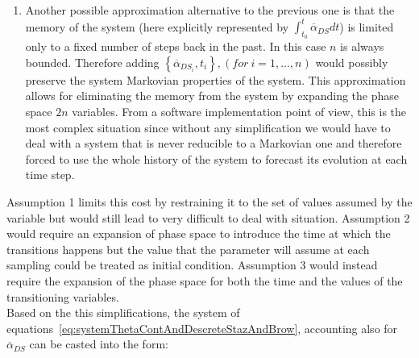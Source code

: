 \begin{enumerate}
  \item Another possible approximation alternative to the previous one is that the memory of the system (here 
  explicitly represented by $ \int_{t_{0}}^{t}  \overline{\alpha }_{DS} dt$) is limited 
  only to a fixed number of steps back in the past. In this case $n$ is always bounded. Therefore adding  $\left \{  
  \overline{\alpha}_{DS_{i}},t_{i} \right \}, \left ( for\: i=1,...,n \right )$ would possibly preserve the system 
  Markovian properties of the system. This approximation allows for eliminating the memory from the system by 
  expanding the phase space $2n$ variables. From a software implementation point of view, this is the most 
  complex  situation since without any simplification we would have to deal with a system that is never reducible 
  to a Markovian one and therefore forced to use the whole history of the system to forecast its evolution at each 
  time step.
\end{enumerate}
Assumption 1 limits this cost by restraining it to the set of values assumed by the 
variable but would still lead to very difficult to deal with situation. Assumption 2 would 
require an expansion of phase space to introduce the time at which the transitions 
happens but the value that the parameter will assume at each sampling could be 
treated as initial condition. Assumption 3 would instead require the expansion of the 
phase space for both the time and the values of the 
transitioning variables.
\\Based on the this simplifications, the system of 
equations~\ref{eq:systemThetaContAndDescreteStazAndBrow}, accounting also for $ \overline{\alpha}_{DS}$ can be casted into the form:
